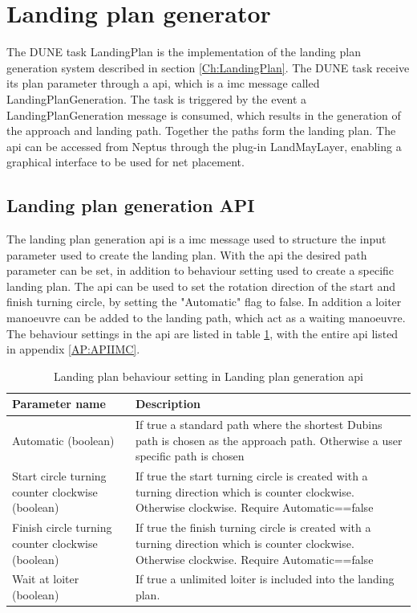 \section{Landing plan generator}
The DUNE task LandingPlan is the implementation of the landing plan generation system described in section \ref{Ch:LandingPlan}. The DUNE task receive its plan parameter through a \gls{api}, which is a \gls{imc} message called LandingPlanGeneration. The task is triggered by the event a LandingPlanGeneration message is consumed, which results in the generation of the approach and landing path. Together the paths form the landing plan. The \gls{api} can be accessed from Neptus through the plug-in LandMayLayer, enabling a graphical interface to be used for net placement.
\subsection{Landing plan generation API}
The landing plan generation \gls{api} is a \gls{imc} message used to structure the input parameter used to create the landing plan. With the \gls{api} the desired path parameter can be set, in addition to behaviour setting used to create a specific landing plan. The \gls{api} can be used to set the rotation direction of the start and finish turning circle, by setting the "Automatic" flag to false. In addition a loiter manoeuvre can be added to the landing path, which act as a waiting manoeuvre. The behaviour settings in the \gls{api} are listed in table \ref{Tb:DubinConfig}, with the entire \gls{api} listed in appendix \ref{AP:APIIMC}.
\begin{table}[H]
\centering
\begin{tabular}{| p{2.7cm} | p{6cm} |}
\hline
\textbf{Parameter name} 							& \textbf{Description} \\ \hline
 Automatic (boolean)								& If true a standard path where the shortest Dubins path is chosen as the approach path. Otherwise a user specific path is chosen \\ \hline
Start circle turning counter clockwise (boolean)	& If true the start turning circle is created with a turning direction which is counter clockwise. Otherwise clockwise. Require Automatic==false \\ \hline
Finish circle turning counter clockwise (boolean)	& If true the finish turning circle is created with a turning direction which is counter clockwise. Otherwise clockwise. Require Automatic==false \\ \hline
Wait at loiter (boolean)							& If true a unlimited loiter is included into the landing plan. \\ \hline

\end{tabular}
\caption{Landing plan behaviour setting in Landing plan generation \gls{api}}
\label{Tb:DubinConfig}
\end{table}
